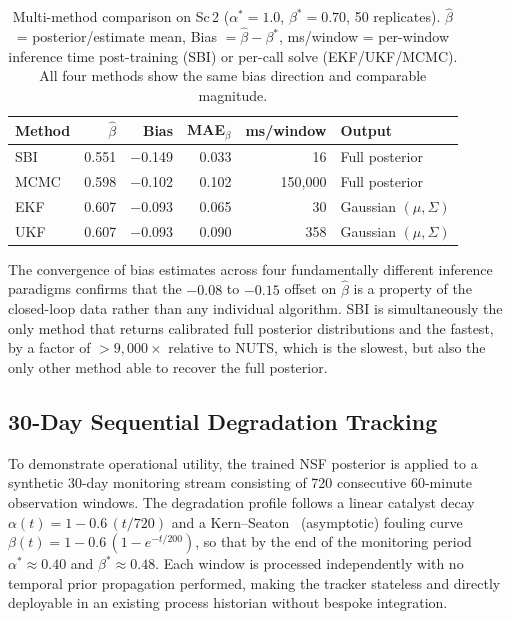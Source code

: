 \documentclass[aps,pre,twocolumn,superscriptaddress]{revtex4-2}
\begin{document}
\begin{table}[ht]
\centering
\caption{Multi-method comparison on Sc\,2 ($\alpha^*=1.0$, $\beta^*=0.70$,
  50 replicates).  $\hat\beta$ = posterior/estimate mean, Bias $=\hat\beta - \beta^*$,
  ms/window = per-window inference time post-training (SBI) or per-call solve (EKF/UKF/MCMC).
  All four methods show the same bias direction and comparable magnitude.}
\label{tab:method_comparison}
\small
\begin{tabular}{lrrrrl}
\toprule
Method & $\hat{\beta}$ & Bias & MAE$_\beta$ & ms/window & Output \\
\midrule
SBI     & 0.551 & $-$0.149 & 0.033 & 16 & Full posterior \\
MCMC    & 0.598 & $-$0.102 & 0.102 & 150{,}000 & Full posterior \\
EKF     & 0.607 & $-$0.093 & 0.065 & 30 & Gaussian $(\mu,\Sigma)$ \\
UKF     & 0.607 & $-$0.093 & 0.090 & 358 & Gaussian $(\mu,\Sigma)$ \\
\bottomrule
\end{tabular}
\end{table}

The convergence of bias estimates across four fundamentally different inference
paradigms confirms that the $-0.08$ to $-0.15$ offset on $\hat\beta$ is a
property of the closed-loop data rather than any individual algorithm.  SBI is
simultaneously the only method that returns calibrated full posterior distributions
and the fastest, by a factor of $>9{,}000\times$ relative to NUTS, which is the slowest, but also the only other method able to recover the full posterior.

\subsection{30-Day Sequential Degradation Tracking}
\label{sec:sequential_tracking}

To demonstrate operational utility, the trained NSF posterior is applied
to a synthetic 30-day monitoring stream consisting of 720 consecutive 60-minute
observation windows.  
The degradation profile follows a linear catalyst decay
$\alpha(t) = 1 - 0.6\,(t/720)$ and a 
Kern--Seaton~\citep{KernSeaton} (asymptotic) fouling curve
$\beta(t) = 1 - 0.6\,(1 - e^{-t/200})$, 
so that by the end of the
monitoring period $\alpha^* \approx 0.40$ and $\beta^* \approx 0.48$.
Each window is processed independently with no temporal prior propagation 
performed, making the tracker stateless and directly deployable in an existing process historian without bespoke integration.
\end{document}
